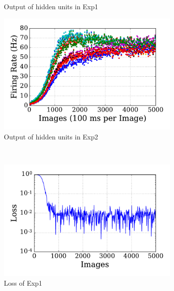 \begin{figure}
\begin{subfigure}[t]{0.48\textwidth}
		\caption{Output of hidden units in Exp1}
	\end{subfigure}
	\begin{subfigure}[t]{0.48\textwidth}
		\includegraphics[width=\textwidth]{pics_sdlm/01_exp_SAE_Orig_long/exp2_hid_s.pdf}
		\caption{Output of hidden units in Exp2}
	\end{subfigure}\\
	\begin{subfigure}[t]{0.48\textwidth}
		\includegraphics[width=\textwidth]{pics_sdlm/01_exp_SAE_Orig_long/exp1_mse_nons.pdf}
		\caption{Loss of Exp1}
	\end{subfigure}
	\begin{subfigure}[t]{0.48\textwidth}

\end{subfigure}
\end{figure}

